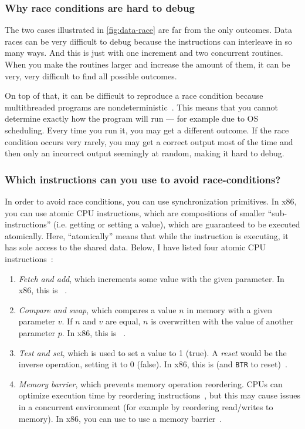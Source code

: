 \subsubsection{Why race conditions are hard to debug}

The two cases illustrated in \autoref{fig:data-race} are far from the only outcomes. Data races can be very difficult to debug because the instructions can interleave in so many ways. And this is just with one increment and two concurrent routines. When you make the routines larger and increase the amount of them, it can be very, very difficult to find all possible outcomes.

On top of that, it can be difficult to reproduce a race condition because multithreaded programs are nondeterministic~\cite[p. 784]{computersystems}. This means that you cannot determine exactly how the program will run --- for example due to OS scheduling. Every time you run it, you may get a different outcome. If the race condition occurs very rarely, you may get a correct output most of the time and then only an incorrect output seemingly at random, making it hard to debug.

\subsubsection{Which instructions can you use to avoid race-conditions?}

In order to avoid race conditions, you can use synchronization primitives. In x86, you can use atomic CPU instructions, which are compositions of smaller ``sub-instructions'' (i.e. getting or setting a value), which are guaranteed to be executed atomically. Here, ``atomically'' means that while the instruction is executing, it has sole access to the shared data. Below, I have listed four atomic CPU instructions~\cite[slide 60]{concurrencyslides}:

\begin{enumerate}
  \item \textit{Fetch and add}, which increments some value with the given parameter. In x86, this is ~\cite[p. 1170]{x86manual}.
  \item \textit{Compare and swap}, which compares a value $n$ in memory with a given parameter $v$. If $n$ and $v$ are equal, $n$ is overwritten with the value of another parameter $p$. In x86, this is ~\cite[p. 779]{x86manual}.
  \item \textit{Test and set}, which is used to set a value to 1 (true). A \textit{reset} would be the inverse operation, setting it to 0 (false). In x86, this is  (and \texttt{BTR} to reset)~\cite[p. 1170]{x86manual}.
  \item \textit{Memory barrier}, which prevents memory operation reordering. CPUs can optimize execution time by reordering instructions~\cite[slide 56-59]{concurrencyslides}, but this may cause issues in a concurrent environment (for example by reordering read/writes to memory). In x86, you can use  to use a memory barrier~\cite[p. 1170]{x86manual}.
\end{enumerate}

